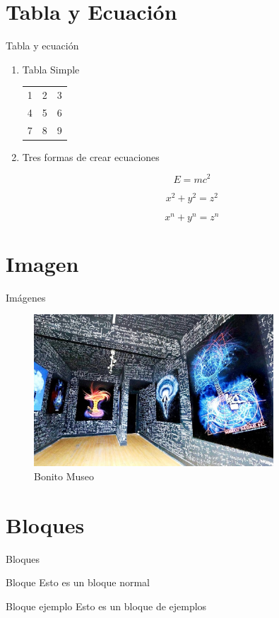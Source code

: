 \documentclass[a4paper,10pt]{beamer}
\begin{document}
\section{Tabla y Ecuaci\'on}
\begin{frame}{Tabla y ecuaci\'on}
  
\begin{enumerate}
 \item Tabla Simple
 
\begin{center}
 \begin{tabular}{l c r } 
	    1 & 2 & 3 %
	    \\ 4 & 5 & 6  %
	    \\ 7 & 8 & 9 \\ %
\end{tabular}
\end{center}

 \item Tres formas de crear ecuaciones

\begin{equation}
E = mc^2
\end{equation}

$$
x^2 + y^2 = z^2
$$

\[ x^n + y^n = z^n \]
\end{enumerate}
\end{frame}

\section{Imagen}
\begin{frame}{Im\'agenes}
\begin{figure}[h]
 \centering 
 \includegraphics[width=0.8\textwidth]{1}
 \captionsetup[figura]{name=Figura}
 \caption{Bonito Museo}
\end{figure}
\end{frame}

\section{Bloques}
\begin{frame}{Bloques}
 
 \begin{block}{Bloque}
  Esto es un bloque normal
 \end{block}
 
 \vfill
 
 \begin{exampleblock}{Bloque ejemplo}
  Esto es un bloque de ejemplos
 \end{exampleblock}
\end{frame}
\end{document}
